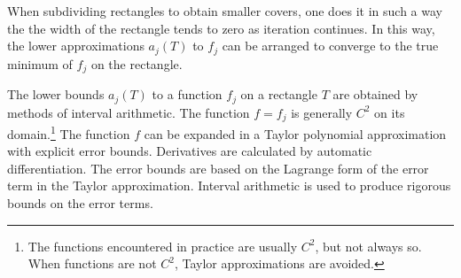 \documentclass{article} %
\begin{document}


When subdividing rectangles to obtain smaller covers, one does
it in such a way the the width of the rectangle tends to zero
as iteration continues.
In this way,  the lower approximations 
$a_j(T)$ to $f_j$ can be arranged to converge to the true minimum of $f_j$ on the
rectangle.

The lower bounds $a_j(T)$ to a function $f_j$ on a rectangle $T$
are obtained by methods of interval arithmetic.  The function
$f=f_j$ is generally $C^2$ on its domain.\footnote{The functions
 encountered in practice are usually $C^2$, but not always so.  When functions are not
$C^2$,  Taylor approximations are avoided.}  
The function $f$ can be expanded in a Taylor polynomial approximation with
explicit error bounds.  Derivatives are calculated by automatic
differentiation.  The error bounds are based on the Lagrange form of
the error term in the Taylor approximation.  Interval arithmetic is used to produce rigorous bounds on the error terms.

\end{document}
